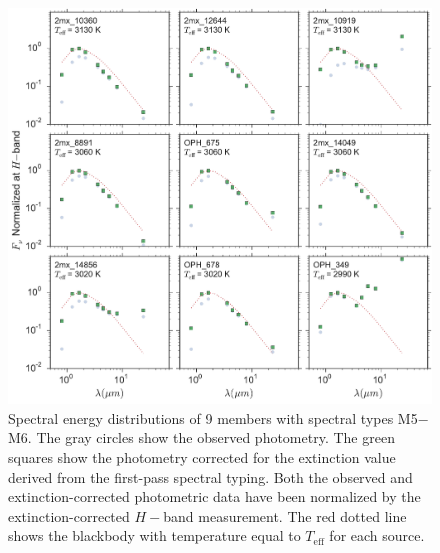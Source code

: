\begin{figure}[ht!]
  \caption[Spectral energy distributions of nine members of \emph{Ophiuchus}]{Spectral energy distributions of 9 members with spectral types M5$-$M6.  The gray circles show the observed photometry.  The green squares show the photometry corrected for the extinction value derived from the first-pass spectral typing.  Both the observed and extinction-corrected photometric data have been normalized by the extinction-corrected $H-$band measurement.  The red dotted line shows the blackbody with temperature equal to $T_{\mathrm{eff}}$ for each source.  \label{fig_SEDs_9panel} }
\centering
\includegraphics[scale=0.5]{chIMACS/figures/SEDS_9panel}
\end{figure}


